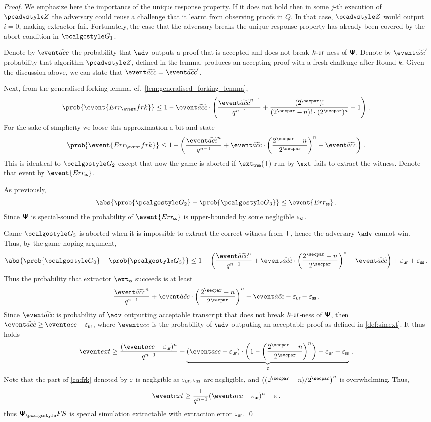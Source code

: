 \documentclass[runningheads,11pt]{llncs}
\begin{document}
\begin{proof}
We emphasize here the importance of the unique response property. If it does not
hold then in some $j$-th execution of $\zdv$ the adversary could reuse a
challenge that it learnt from observing proofs in $Q$. In that case, $\zdv$
would output $i = 0$, making extractor fail. Fortunately, the case that the
adversary breaks the unique response property has already been covered by the
abort condition in $\game{1}$.

Denote by $\waccProb$ the probability that $\advse$ outputs a proof that is
accepted and does not break ${k\text{-}\mathsf{ur}}$-ness of $\bm{\mathsf{\Psi}}$.  Denote by $\waccProb'$
probability that algorithm $\zdv$, defined in the lemma, produces an accepting
proof with a fresh challenge after Round $k$. Given the discussion above, we can
state that $\waccProb = \waccProb'$.

Next, from the generalised forking lemma, cf.~\cref{lem:generalised_forking_lemma},
\[
	\prob{\event{\errfrk}} \leq 1 -
	\waccProb \cdot \left(\frac{\waccProb^{n - 1}}{q^{n - 1}} +
	\frac{(2^\secpar) !}{(2^\secpar - n)! \cdot
(2^\secpar)^{n}} - 1\right)\,.
\]
For the sake of simplicity we loose this approximation a bit and state
\[
	\prob{\event{\errfrk}} \leq 1 -
	\left(\frac{\waccProb^{n}}{q^{n - 1}} +
		\waccProb \cdot \left(\frac{2^\secpar - n}{2^\secpar}\right)^{n} -
	\waccProb\right)\,.
\]
 This is identical to $\game{2}$ except that now the game is aborted if
$\extt(\tree)$ run by $\ext$ fails to extract the witness. Denote that event by
$\event{\errss}$.

As previously, 
\[
	\abs{\prob{\game{2}} - \prob{\game{3}}} \leq \event{\errss}\,.
\]
Since $\bm{\mathsf{\Psi}}$ is special-sound the probability of $\event{\errss}$ is
upper-bounded by some negligible $\varepsilon_{\mathsf{ss}}$.

Game $\game{3}$ is aborted when it is impossible to extract the correct witness
from $\mathsf{T}$, hence the adversary $\advse$ cannot win.  Thus, by the game-hoping
argument,
\[
	\abs{\prob{\game{0}} - \prob{\game{3}}} \leq 1 -
	\left(\frac{\waccProb^{n}}{q^{n - 1}} + \waccProb \cdot
	\left(\frac{2^\secpar - n}{2^\secpar}\right)^{n} - \waccProb\right) + \epsur + \epsss\,.
\]
Thus the probability that extractor $\extss$ succeeds is at least
\[
	\frac{\waccProb^{n}}{q^{n - 1}} + 
	\waccProb \cdot
	\left( \frac{2^\secpar - n}{2^\secpar}\right)^{n} -
\waccProb - \epsur - \epsss\,.
\]
Since $\waccProb$ is probability of $\advse$ outputting acceptable transcript
that does not break ${k\text{-}\mathsf{ur}}$-ness of $\bm{\mathsf{\Psi}}$, then $\waccProb \geq \accProb -
\epsur$, where $\accProb$ is the probability of $\advse$ outputing an acceptable
proof as defined in \cref{def:simext}. It thus holds
\[
	\label{eq:frk}
	\extProb \geq \frac{(\accProb - \epsur)^{n}}{q^{n - 1}} -
	\underbrace{(\accProb - \epsur) \cdot \left( 1 -
      \left(\frac{2^\secpar - n}{2^\secpar}\right)^{n}\right)
- \epsur - \epsss}_{\eps}\,.
\]
Note that the part of \cref{eq:frk} denoted by $\varepsilon$ is negligible as
$\varepsilon_{\mathsf{ur}}, \varepsilon_{\mathsf{ss}}$ are negligible, and $\left(\infrac{(2^\secpar
- n)}{2^\secpar}\right)^{n}$ is overwhelming.
Thus, 
\[
	\extProb \geq \frac{1}{q^{n - 1}} (\accProb - \epsur)^{n} -\eps\,.
\] 
thus
$\psfs$ is special simulation extractable with extraction error $\varepsilon_{\mathsf{ur}}$.
\qed
\end{proof}
\end{document}
